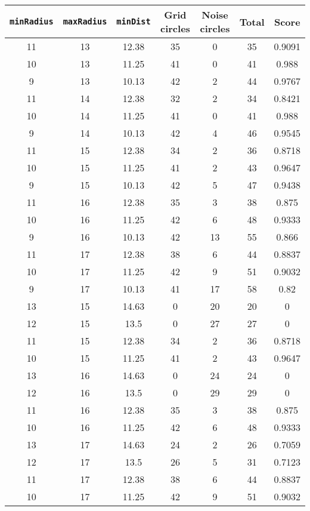 \documentclass[letterpaper, 12pt]{article}
\begin{document}
\begin{longtable}{|c|c|c|c|c|c|c|}
\hline
\textbf{\texttt{minRadius}} & \textbf{\texttt{maxRadius}} & \textbf{\texttt{minDist}} & \textbf{Grid circles} & \textbf{Noise circles} & \textbf{Total} & \textbf{Score} \\
\hline
11 & 13 & 12.38 & 35 & 0 & 35 & 0.9091 \\
\hline
10 & 13 & 11.25 & 41 & 0 & 41 & 0.988 \\
\hline
9 & 13 & 10.13 & 42 & 2 & 44 & 0.9767 \\
\hline
11 & 14 & 12.38 & 32 & 2 & 34 & 0.8421 \\
\hline
10 & 14 & 11.25 & 41 & 0 & 41 & 0.988 \\
\hline
9 & 14 & 10.13 & 42 & 4 & 46 & 0.9545 \\
\hline
11 & 15 & 12.38 & 34 & 2 & 36 & 0.8718 \\
\hline
10 & 15 & 11.25 & 41 & 2 & 43 & 0.9647 \\
\hline
9 & 15 & 10.13 & 42 & 5 & 47 & 0.9438 \\
\hline
11 & 16 & 12.38 & 35 & 3 & 38 & 0.875 \\
\hline
10 & 16 & 11.25 & 42 & 6 & 48 & 0.9333 \\
\hline
9 & 16 & 10.13 & 42 & 13 & 55 & 0.866 \\
\hline
11 & 17 & 12.38 & 38 & 6 & 44 & 0.8837 \\
\hline
10 & 17 & 11.25 & 42 & 9 & 51 & 0.9032 \\
\hline
9 & 17 & 10.13 & 41 & 17 & 58 & 0.82 \\
\hline
13 & 15 & 14.63 & 0 & 20 & 20 & 0 \\
\hline
12 & 15 & 13.5 & 0 & 27 & 27 & 0 \\
\hline
11 & 15 & 12.38 & 34 & 2 & 36 & 0.8718 \\
\hline
10 & 15 & 11.25 & 41 & 2 & 43 & 0.9647 \\
\hline
13 & 16 & 14.63 & 0 & 24 & 24 & 0 \\
\hline
12 & 16 & 13.5 & 0 & 29 & 29 & 0 \\
\hline
11 & 16 & 12.38 & 35 & 3 & 38 & 0.875 \\
\hline
10 & 16 & 11.25 & 42 & 6 & 48 & 0.9333 \\
\hline
13 & 17 & 14.63 & 24 & 2 & 26 & 0.7059 \\
\hline
12 & 17 & 13.5 & 26 & 5 & 31 & 0.7123 \\
\hline
11 & 17 & 12.38 & 38 & 6 & 44 & 0.8837 \\
\hline
10 & 17 & 11.25 & 42 & 9 & 51 & 0.9032 \\

\end{longtable}
\end{document}
